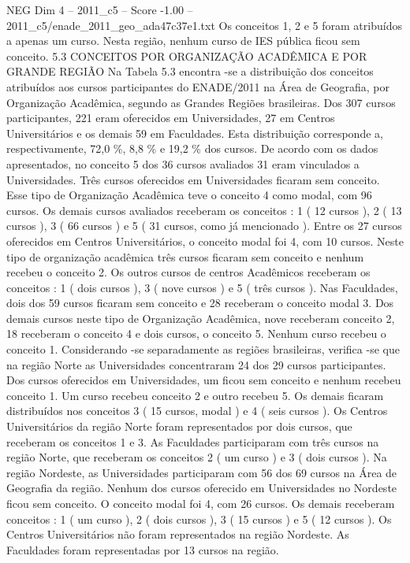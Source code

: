 \begin{textsample}{NEG Dim 4 – 2011\_c5 – Score -1.00 – 2011\_c5/enade\_2011\_geo\_ada47c37e1.txt}
Os conceitos 1, 2 e 5 foram atribuídos a apenas um curso.
Nesta região, nenhum curso de IES pública ficou sem conceito. 5.3 CONCEITOS POR ORGANIZAÇÃO ACADÊMICA E POR GRANDE REGIÃO Na Tabela 5.3 encontra -se a distribuição dos conceitos atribuídos aos cursos participantes do ENADE/2011 na Área de Geografia, por Organização Acadêmica, segundo as Grandes Regiões brasileiras.
Dos 307 cursos participantes, 221 eram oferecidos em Universidades, 27 em Centros Universitários e os demais 59 em Faculdades.
Esta distribuição corresponde a, respectivamente, 72,0 \%, 8,8 \% e 19,2 \% dos cursos.
De acordo com os dados apresentados, no conceito 5 dos 36 cursos avaliados 31 eram vinculados a Universidades.
Três cursos oferecidos em Universidades ficaram sem conceito.
Esse tipo de Organização Acadêmica teve o conceito 4 como modal, com 96 cursos.
Os demais cursos avaliados receberam os conceitos : 1 ( 12 cursos ), 2 ( 13 cursos ), 3 ( 66 cursos ) e 5 ( 31 cursos, como já mencionado ).
Entre os 27 cursos oferecidos em Centros Universitários, o conceito modal foi 4, com 10 cursos.
Neste tipo de organização acadêmica três cursos ficaram sem conceito e nenhum recebeu o conceito 2.
Os outros cursos de centros Acadêmicos receberam os conceitos : 1 ( dois cursos ), 3 ( nove cursos ) e 5 ( três cursos ).
Nas Faculdades, dois dos 59 cursos ficaram sem conceito e 28 receberam o conceito modal 3.
Dos demais cursos neste tipo de Organização Acadêmica, nove receberam conceito 2, 18 receberam o conceito 4 e dois cursos, o conceito 5.
Nenhum curso recebeu o conceito 1.
Considerando -se separadamente as regiões brasileiras, verifica -se que na região Norte as Universidades concentraram 24 dos 29 cursos participantes.
Dos cursos oferecidos em Universidades, um ficou sem conceito e nenhum recebeu conceito 1.
Um curso recebeu conceito 2 e outro recebeu 5.
Os demais ficaram distribuídos nos conceitos 3 ( 15 cursos, modal ) e 4 ( seis cursos ).
Os Centros Universitários da região Norte foram representados por dois cursos, que receberam os conceitos 1 e 3.
As Faculdades participaram com três cursos na região Norte, que receberam os conceitos 2 ( um curso ) e 3 ( dois cursos ).
Na região Nordeste, as Universidades participaram com 56 dos 69 cursos na Área de Geografia da região.
Nenhum dos cursos oferecido em Universidades no Nordeste ficou sem conceito.
O conceito modal foi 4, com 26 cursos.
Os demais receberam conceitos : 1 ( um curso ), 2 ( dois cursos ), 3 ( 15 cursos ) e 5 ( 12 cursos ).
Os Centros Universitários não foram representados na região Nordeste.
As Faculdades foram representadas por 13 cursos na região.

\end{textsample}
